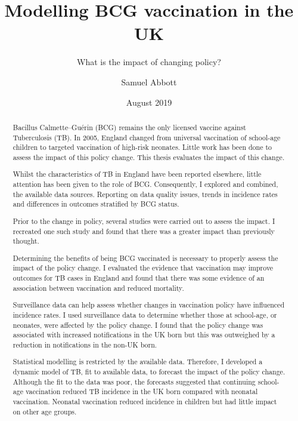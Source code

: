 \documentclass[11pt,twoside]{bristolthesis}
\title{Modelling BCG vaccination in the UK}
\subtitle{What is the impact of changing policy?}
\author{Samuel Abbott}
\date{August 2019}
\begin{document}
  \maketitle

  \frontmatter %

      \begin{abstract}
      Bacillus Calmette--Guérin (BCG) remains the only licensed vaccine against Tuberculosis (TB). In 2005, England changed from universal vaccination of school-age children to targeted vaccination of high-risk neonates. Little work has been done to assess the impact of this policy change. This thesis evaluates the impact of this change.
      
      \par
      
      Whilst the characteristics of TB in England have been reported elsewhere, little attention has been given to the role of BCG. Consequently, I explored and combined, the available data sources. Reporting on data quality issues, trends in incidence rates and differences in outcomes stratified by BCG status.
      
      \par
      
      Prior to the change in policy, several studies were carried out to assess the impact. I recreated one such study and found that there was a greater impact than previously thought.
      
      \par
      
      Determining the benefits of being BCG vaccinated is necessary to properly assess the impact of the policy change. I evaluated the evidence that vaccination may improve outcomes for TB cases in England and found that there was some evidence of an association between vaccination and reduced mortality.
      
      \par
      
      Surveillance data can help assess whether changes in vaccination policy have influenced incidence rates. I used surveillance data to determine whether those at school-age, or neonates, were affected by the policy change. I found that the policy change was associated with increased notifications in the UK born but this was outweighed by a reduction in notifications in the non-UK born.
      
      \par
      
      Statistical modelling is restricted by the available data. Therefore, I developed a dynamic model of TB, fit to available data, to forecast the impact of the policy change. Although the fit to the data was poor, the forecasts suggested that continuing school-age vaccination reduced TB incidence in the UK born compared with neonatal vaccination. Neonatal vaccination reduced incidence in children but had little impact on other age groups.
      
      \par
    \end{abstract}
\end{document}
